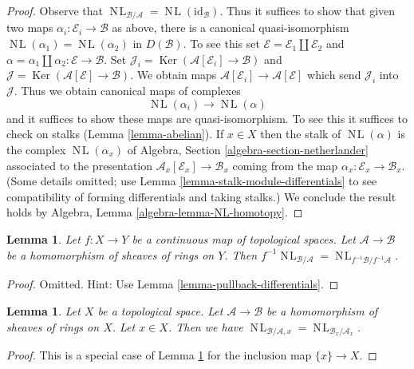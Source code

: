 \documentclass{stacks-project}
\theoremstyle{plain}
\newtheorem{lemma}[subsection]{Lemma}
\theoremstyle{definition}
\theoremstyle{remark}
\numberwithin{equation}{subsection}
\def\NL{\mathop{N\!L}\nolimits}
\def\Ker{\mathop{\mathrm{Ker}}}
\begin{document}
\begin{proof}
Observe that $\NL_{\mathcal{B}/\mathcal{A}} = \NL(\text{id}_\mathcal{B})$.
Thus it suffices to show that given two maps
$\alpha_i : \mathcal{E}_i \to \mathcal{B}$ as above, there is a
canonical quasi-isomorphism $\NL(\alpha_1) = \NL(\alpha_2)$ in $D(\mathcal{B})$.
To see this set $\mathcal{E} = \mathcal{E}_1 \amalg \mathcal{E}_2$ and
$\alpha = \alpha_1 \amalg \alpha_2 : \mathcal{E} \to \mathcal{B}$.
Set
$\mathcal{J}_i = \Ker(\mathcal{A}[\mathcal{E}_i] \to \mathcal{B})$
and
$\mathcal{J} = \Ker(\mathcal{A}[\mathcal{E}] \to \mathcal{B})$.
We obtain maps $\mathcal{A}[\mathcal{E}_i] \to \mathcal{A}[\mathcal{E}]$
which send $\mathcal{J}_i$ into $\mathcal{J}$.
Thus we obtain canonical maps of complexes
$$
\NL(\alpha_i) \longrightarrow \NL(\alpha)
$$
and it suffices to show these maps are quasi-isomorphism. To see this
it suffices to check on stalks (Lemma \ref{lemma-abelian}). If $x \in X$
then the stalk of $\NL(\alpha)$ is the complex $\NL(\alpha_x)$ of
Algebra, Section \ref{algebra-section-netherlander}
associated to the presentation $\mathcal{A}_x[\mathcal{E}_x] \to \mathcal{B}_x$
coming from the map $\alpha_x : \mathcal{E}_x \to \mathcal{B}_x$.
(Some details omitted; use Lemma \ref{lemma-stalk-module-differentials}
to see compatibility of forming differentials and taking stalks.)
We conclude the result holds by
Algebra, Lemma \ref{algebra-lemma-NL-homotopy}.
\end{proof}

\begin{lemma}
\label{lemma-pullback-NL}
Let $f : X \to Y$ be a continuous map of topological spaces.
Let $\mathcal{A} \to \mathcal{B}$ be a homomorphism of sheaves of rings
on $Y$. Then $f^{-1}\NL_{\mathcal{B}/\mathcal{A}} =
\NL_{f^{-1}\mathcal{B}/f^{-1}\mathcal{A}}$.
\end{lemma}

\begin{proof}
Omitted. Hint: Use Lemma \ref{lemma-pullback-differentials}.
\end{proof}

\begin{lemma}
\label{lemma-stalk-NL}
Let $X$ be a topological space. Let $\mathcal{A} \to \mathcal{B}$
be a homomorphism of sheaves of rings on $X$. Let $x \in X$.
Then we have $\NL_{\mathcal{B}/\mathcal{A}, x} =
\NL_{\mathcal{B}_x/\mathcal{A}_x}$.
\end{lemma}

\begin{proof}
This is a special case of Lemma \ref{lemma-pullback-NL}
for the inclusion map $\{x\} \to X$.
\end{proof}
\end{document}
